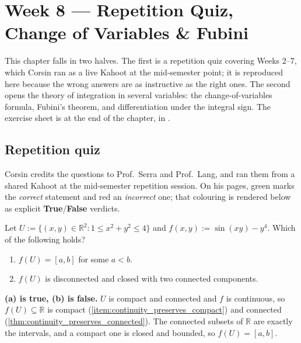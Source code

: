 \chapter{Week 8 --- Repetition Quiz, Change of Variables \& Fubini}
\label{ch:week08}

This chapter falls in two halves. The first is a repetition quiz covering Weeks 2--7, which
Corsin ran as a live Kahoot at the mid-semester point; it is reproduced here because the wrong
answers are as instructive as the right ones. The second opens the theory of integration in
several variables: the change-of-variables formula, Fubini's theorem, and differentiation under
the integral sign. The exercise sheet is at the end of the chapter, in
.

\section{Repetition quiz}
\label{sec:week08_quiz}

\begin{ainote}
Corsin credits the questions to Prof.\ Serra and Prof.\ Lang, and ran them from a shared Kahoot
at the mid-semester repetition session. On his pages, \textcolor{green!60!black}{green} marks the
\emph{correct} statement and \textcolor{red!80!black}{red} an \emph{incorrect} one; that colouring
is rendered below as explicit \textbf{True}/\textbf{False} verdicts.
\end{ainote}

\begin{question}
\label{q:week08_q1}
Let $U := \{(x,y) \in \mathbb{R}^2 : 1 \leq x^2+y^2 \leq 4\}$ and
$f(x,y) := \sin(xy) - y^4$. Which of the following holds?
\begin{enumerate}[label=\textbf{(\alph*)}]
  \item $f(U) = [a,b]$ for some $a < b$.
  \item $f(U)$ is disconnected and closed with two connected components.
\end{enumerate}
\end{question}

\begin{answer}
\textbf{(a) is true, (b) is false.} $U$ is compact and connected and $f$ is continuous, so
$f(U) \subseteq \mathbb{R}$ is compact (\cref{item:continuity_preserves_compact}) and connected
(\cref{thm:continuity_preserves_connected}). The connected subsets of $\mathbb{R}$ are exactly
the intervals, and a compact one is closed and bounded, so $f(U) = [a,b]$.
\end{answer}

